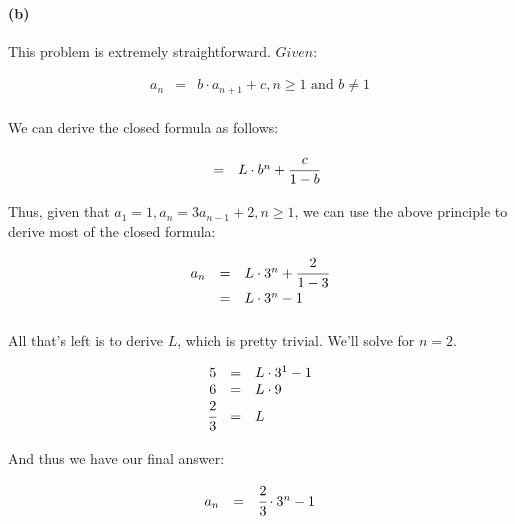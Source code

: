 \documentclass[a4paper]{article}
\begin{document}
\paragraph{(b)} This problem is extremely straightforward. $\textit{Given}$:

\begin{equation*}
\begin{array}{rcl}
a_n & = & b \cdot a_{n+1} + c, n \ge 1 \mbox{ and } b \ne 1 \\[.08in]
\end{array}
\end{equation*}

We can derive the closed formula as follows:

\begin{equation*}
\begin{array}{rcl}
& = & L \cdot b^n + \cfrac{c}{1-b} \\[.08in]
\end{array}
\end{equation*}

Thus, given that $a_1 = 1, a_n = 3a_{n-1} + 2, n \ge 1$, we can use the above principle to derive most of the closed formula:

\begin{equation*}
\begin{array}{rcl}
a_n & = & L \cdot 3^n + \cfrac{2}{1-3} \\[.08in]
& = & L \cdot 3^n - 1 \\[.08in]
\end{array}
\end{equation*}

All that's left is to derive $L$, which is pretty trivial. We'll solve for $n = 2$.

\begin{equation*}
\begin{array}{rcl}
5 & = & L \cdot 3^1 - 1 \\[.0in]
6 & = & L \cdot 9 \\[.0in]
\cfrac{2}{3} & = & L \\[.08in]
\end{array}
\end{equation*}

And thus we have our final answer:

\begin{equation}
\begin{array}{rcl}
a_n & = & \cfrac{2}{3} \cdot 3^n - 1 \\[.08in]
\end{array}
\end{equation}
\end{document}
